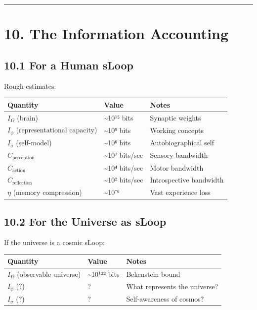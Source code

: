 \documentclass[
  11pt,
  letterpaper,
  twoside,
  openany]{book}
\makeatletter
\let\orig@section\section
\renewcommand{\section}{\needspace{8\baselineskip}\orig@section}
\let\orig@subsection\subsection
\renewcommand{\subsection}{\needspace{6\baselineskip}\orig@subsection}
\makeatother
\begin{document}
\begin{center}\rule{0.5\linewidth}{0.5pt}\end{center}

\section{10. The Information
Accounting}\label{the-information-accounting}

\subsection{10.1 For a Human sLoop}\label{for-a-human-sloop}

Rough estimates:

\begin{longtable}[]{@{}lll@{}}
\toprule\noalign{}
Quantity & Value & Notes \\
\midrule\noalign{}
\endhead
\bottomrule\noalign{}
\endlastfoot
\(I_\Omega\) (brain) & \textasciitilde10¹⁵ bits & Synaptic weights \\
\(I_\phi\) (representational capacity) & \textasciitilde10⁹ bits &
Working concepts \\
\(I_\sigma\) (self-model) & \textasciitilde10⁶ bits & Autobiographical
self \\
\(C_{\text{perception}}\) & \textasciitilde10⁷ bits/sec & Sensory
bandwidth \\
\(C_{\text{action}}\) & \textasciitilde10⁴ bits/sec & Motor bandwidth \\
\(C_{\text{reflection}}\) & \textasciitilde10² bits/sec & Introspective
bandwidth \\
\(\eta\) (memory compression) & \textasciitilde10⁻⁶ & Vast experience
loss \\
\end{longtable}

\subsection{10.2 For the Universe as
sLoop}\label{for-the-universe-as-sloop}

If the universe is a cosmic sLoop:

\begin{longtable}[]{@{}lll@{}}
\toprule\noalign{}
Quantity & Value & Notes \\
\midrule\noalign{}
\endhead
\bottomrule\noalign{}
\endlastfoot
\(I_\Omega\) (observable universe) & \textasciitilde10¹²² bits &
Bekenstein bound \\
\(I_\phi\) (?) & ? & What represents the universe? \\
\(I_\sigma\) (?) & ? & Self-awareness of cosmos? \\
\end{longtable}
\end{document}
